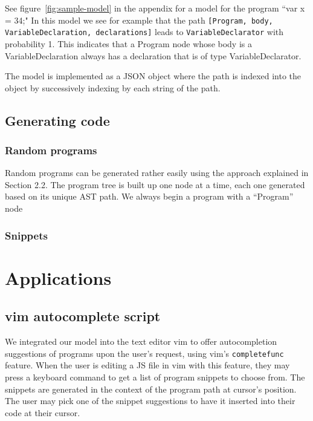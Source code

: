 \documentclass{article}
\begin{document}
See figure~\ref{fig:sample-model} in the appendix for a model for the program
``var x = 34;" In this model we see for example that the path
\texttt{[Program, body, VariableDeclaration, declarations]} leads to
\texttt{VariableDeclarator} with probability 1. This indicates that a Program
node whose body is a VariableDeclaration always has a declaration that is of
type VariableDeclarator.

The model is implemented as a JSON object where the path is indexed into the
object by successively indexing by each string of the path.


\subsection{Generating code}

\subsubsection{Random programs}

Random programs can be generated rather easily using the approach explained in Section 2.2. The program tree is built up one node at a time, each one generated based on its unique AST path. We always begin a program with a ``Program'' node

\subsubsection{Snippets}



%

\section{Applications}

\subsection{vim autocomplete script}

We integrated our model into the text editor vim to offer autocompletion
suggestions of programs upon the user's request, using vim's
\texttt{completefunc} feature. When the user is editing a JS file in vim with
this feature, they may press a keyboard command to get a list of program
snippets to choose from. The snippets are generated in the context of the
program path at cursor's position. The user may pick one of the snippet
suggestions to have it inserted into their code at their cursor.
\end{document}
